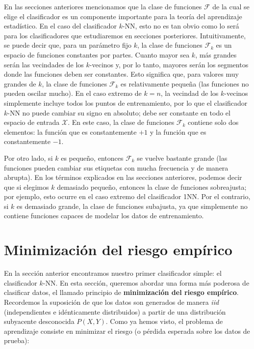 \documentclass{report}
\begin{document}
En las secciones anteriores mencionamos que la clase de funciones \(\mathcal{F}\) de la cual se elige el clasificador
es un componente importante para la teoría del aprendizaje estadístico. En el caso del clasificador \(k\)-NN,
esto no es tan obvio como lo será para los clasificadores que estudiaremos en secciones posteriores.
Intuitivamente, se puede decir que, para un parámetro fijo \(k\), la clase de funciones \(\mathcal{F}_k\) es un espacio
de funciones constantes por partes. Cuanto mayor sea \(k\), más grandes serán las vecindades de los \(k\)-vecinos
y, por lo tanto, mayores serán los segmentos donde las funciones deben ser constantes. Esto significa que,
para valores muy grandes de \(k\), la clase de funciones \(\mathcal{F}_k\) es relativamente pequeña (las funciones no
pueden oscilar mucho). En el caso extremo de \(k = n\), la vecindad de los \(k\)-vecinos simplemente incluye
todos los puntos de entrenamiento, por lo que el clasificador \(k\)-NN no puede cambiar su signo en absoluto;
debe ser constante en todo el espacio de entrada \(\mathcal{X}\). En este caso, la clase de funciones \(\mathcal{F}_k\) contiene solo
dos elementos: la función que es constantemente \(+1\) y la función que es constantemente \(-1\).

Por otro lado, si \(k\) es pequeño, entonces \(\mathcal{F}_k\) se vuelve bastante grande (las funciones pueden cambiar sus
etiquetas con mucha frecuencia y de manera abrupta). En los términos explicados en las secciones anteriores,
podemos decir que si elegimos \(k\) demasiado pequeño, entonces la clase de funciones sobreajusta;
por ejemplo, esto ocurre en el caso extremo del clasificador 1NN. Por el contrario, si \(k\) es demasiado grande,
la clase de funciones subajusta, ya que simplemente no contiene funciones capaces de modelar los
datos de entrenamiento.

\section{Minimización del riesgo empírico}

En la sección anterior encontramos nuestro primer clasificador simple: el clasificador \(k\)-NN. En esta sección,
queremos abordar una forma más poderosa de clasificar datos, el llamado principio de \textbf{minimización
del riesgo empírico}. Recordemos la suposición de que los datos son generados de manera \textit{iid}
(independientes e idénticamente distribuidos) a partir de una distribución subyacente desconocida \(P(X, Y)\).
Como ya hemos visto, el problema de aprendizaje consiste en minimizar el riesgo (o pérdida esperada sobre
los datos de prueba):
\end{document}
